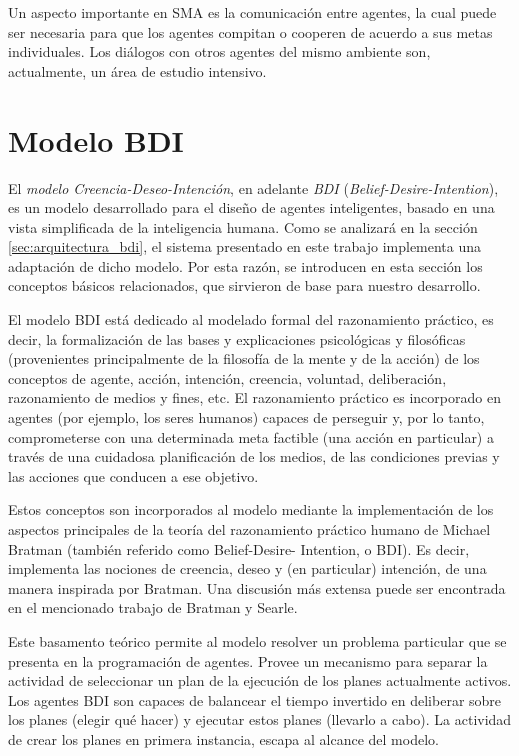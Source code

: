  Un aspecto importante en SMA es la comunicación entre agentes, la cual
 puede ser necesaria para que los agentes compitan o cooperen de
 acuerdo a sus metas individuales. 
 Los diálogos con otros agentes del mismo ambiente son, actualmente, un
 área de estudio intensivo.

\section{Modelo BDI}
\label{sec:modelo_bdi}
 
 El \textit{modelo Creencia-Deseo-Intención}, en adelante \textit{BDI}
 (\textit{Belief-Desire-Intention}), es un modelo desarrollado para el
 diseño de agentes inteligentes, basado en una vista simplificada de la
 inteligencia humana.
 Como se analizará en la sección \ref{sec:arquitectura_bdi}, el sistema
 presentado en este trabajo implementa una  adaptación de dicho modelo.
 Por esta razón, se introducen en esta sección los  conceptos básicos
 relacionados, que sirvieron de base para nuestro desarrollo.
 
 El modelo BDI está dedicado al modelado formal del razonamiento
 práctico, es  decir, la formalización de las bases y explicaciones
 psicológicas y filosóficas  (provenientes principalmente de la
 filosofía de la mente y de la acción) de los  conceptos de agente,
 acción, intención, creencia, voluntad, deliberación,  razonamiento de
 medios y fines, etc.
 El razonamiento práctico es incorporado  en agentes (por ejemplo, los
 seres humanos) capaces de perseguir y, por lo tanto,  comprometerse
 con una determinada meta factible (una acción en particular)  a través
 de una cuidadosa planificación de los medios, de las condiciones
 previas  y las acciones que conducen a ese objetivo.

 Estos conceptos son incorporados al modelo mediante la implementación
 de los  aspectos principales de la teoría del razonamiento práctico
 humano de Michael Bratman (también referido como Belief-Desire-
 Intention, o BDI).
 Es decir, implementa  las nociones de creencia, deseo y (en
 particular) intención, de una manera inspirada  por Bratman.
 Una discusión más extensa puede ser encontrada en el mencionado
 trabajo de Bratman\cite{brat99} y Searle\cite{searle1985}.
 
 Este basamento teórico permite al modelo resolver un problema
 particular que  se presenta en la programación de agentes.
 Provee un mecanismo para separar la  actividad de seleccionar un plan
 de la ejecución de los planes actualmente activos.
 Los agentes BDI son capaces de balancear el tiempo invertido en
 deliberar sobre los planes (elegir qué hacer) y ejecutar estos planes
 (llevarlo a cabo).
 La actividad  de crear los planes en primera instancia, escapa al
 alcance del modelo.

